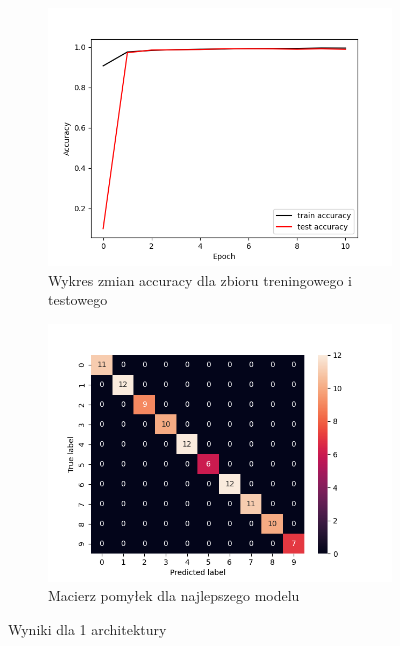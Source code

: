 \documentclass[10pt]{article}
\begin{document}
\begin{figure}[htbp]
    \centering
    \begin{subfigure}[b]{0.2\textwidth}
        \includegraphics[width=\textwidth]{img/magda/magda_MNIST_1_accuracy_10epochs}
        \caption{Wykres zmian accuracy dla zbioru treningowego i testowego}
        \label{fig:sub1}
    \end{subfigure}
    \begin{subfigure}[b]{0.2\textwidth}
        \includegraphics[width=\textwidth]{img/magda/magda_MNIST_1_matrix_best}
        \caption{Macierz pomyłek dla najlepszego modelu}
        \label{fig:sub2}
    \end{subfigure}
    \caption{Wyniki dla 1 architektury}
    \label{fig:eksperyment1_mnist_magda}
\end{figure}
\end{document}
